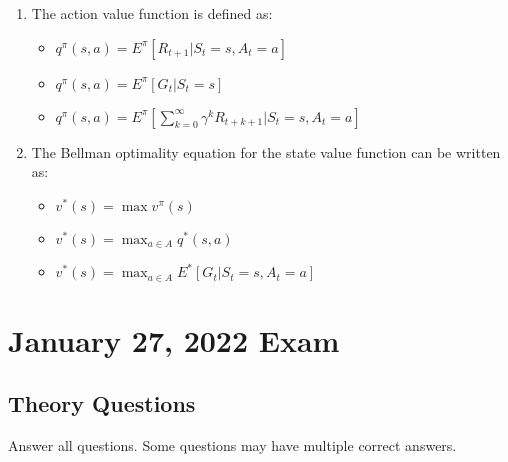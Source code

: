 \documentclass[openany]{book}
\theoremstyle{definition}
\theoremstyle{remark}
\begin{document}
\begin{enumerate}
    \item The action value function is defined as:
    \begin{itemize}
        \item[] $q^\pi(s,a) = E^\pi[R_{t+1}|S_t = s, A_t = a]$
        \item[] $q^\pi(s,a) = E^\pi[G_t|S_t = s]$
        \item[\checkmark] $q^\pi(s,a) = E^\pi[\sum_{k=0}^\infty \gamma^k R_{t+k+1}|S_t = s, A_t = a]$
    \end{itemize}

    \item The Bellman optimality equation for the state value function can be written as:
    \begin{itemize}
        \item[] $v^*(s) = \max v^\pi(s)$
        \item[\checkmark] $v^*(s) = \max_{a\in A} q^*(s,a)$
        \item[\checkmark] $v^*(s) = \max_{a\in A} E^*[G_t|S_t = s, A_t = a]$
    \end{itemize}
\end{enumerate}

\chapter{January 27, 2022 Exam}

\section*{Theory Questions}
Answer all questions. Some questions may have multiple correct answers.
\end{document}
